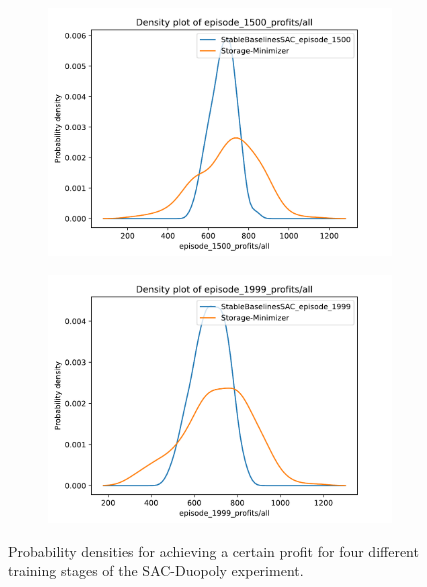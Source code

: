 \begin{figure}
	\begin{subfigure}{0.49\textwidth}
		\centering
		\includegraphics[width = \textwidth]{images/experiments/SACDuopoly/SACDuopolyProfitsDensity3.pdf}\\
		\label{fig:SACDuopolyProfitsDensity3}
	\end{subfigure}
	\begin{subfigure}{0.49\textwidth}
		\centering
		\includegraphics[width = \textwidth]{images/experiments/SACDuopoly/SACDuopolyProfitsDensity4.pdf}\\
		\label{fig:SACDuopolyProfitsDensity4}
	\end{subfigure}
	\caption{Probability densities for achieving a certain profit for four different training stages of the SAC-Duopoly experiment.}\label{fig:SACDuopolyProfitsDensity}
\end{figure}

